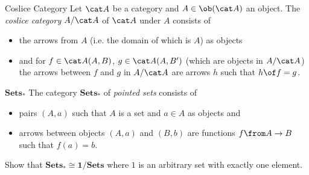 \begin{definition}{Coslice Category}
  Let $\A$ be a category and $A\in\ob(\A)$ an object. The \emph{coslice category} $A/\A$ of $\A$ under $A$ consists of
  \begin{itemize}
  \item the arrows from $A$ (i.e. the domain of which is $A$) as objects
  \item and for $f\in \A(A,B)$, $g\in\A(A,B')$ (which are objects in $A/\A$) the arrows between $f$ and $g$ in $A/\A$ are arrows $h$ such that $h\of f=g$.
  \end{itemize}
\end{definition}

\begin{definition}{$\mathbf{Sets_*}$}
  The category $\mathbf{Sets_*}$ of \emph{pointed sets} consists of
  \begin{itemize}
  \item pairs $(A,a)$ such that $A$ is a set and $a\in A$ as objects and
  \item arrows between objects $(A,a)$ and $(B,b)$ are functions $f\from A\to B$ such that $f(a)=b$.
  \end{itemize}
\end{definition}

\begin{exercise}
Show that $\mathbf{Sets_*\cong 1/\mathbf{Sets}}$ where $1$ is an arbitrary set with exactly one element.
\end{exercise}

